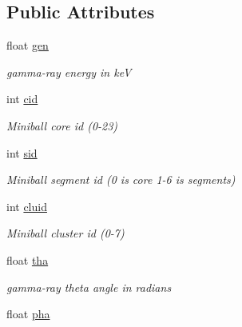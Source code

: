 \subsection*{Public Attributes}
\begin{DoxyCompactItemize}
\item 
\hypertarget{classmbevts_aaa4ca32ce18c059a2603bc496d9abf9c}{float \hyperlink{classmbevts_aaa4ca32ce18c059a2603bc496d9abf9c}{gen}}\label{classmbevts_aaa4ca32ce18c059a2603bc496d9abf9c}

\begin{DoxyCompactList}\small\item\em gamma-\/ray energy in ke\-V \end{DoxyCompactList}\item 
\hypertarget{classmbevts_a4d95d8f16b4de9d05dd5b69b43955459}{int \hyperlink{classmbevts_a4d95d8f16b4de9d05dd5b69b43955459}{cid}}\label{classmbevts_a4d95d8f16b4de9d05dd5b69b43955459}

\begin{DoxyCompactList}\small\item\em Miniball core id (0-\/23) \end{DoxyCompactList}\item 
\hypertarget{classmbevts_a16240b10e7070e1f3c1b6b9f55226609}{int \hyperlink{classmbevts_a16240b10e7070e1f3c1b6b9f55226609}{sid}}\label{classmbevts_a16240b10e7070e1f3c1b6b9f55226609}

\begin{DoxyCompactList}\small\item\em Miniball segment id (0 is core 1-\/6 is segments) \end{DoxyCompactList}\item 
\hypertarget{classmbevts_af6d424478b900af3bc8bce1f4c714105}{int \hyperlink{classmbevts_af6d424478b900af3bc8bce1f4c714105}{cluid}}\label{classmbevts_af6d424478b900af3bc8bce1f4c714105}

\begin{DoxyCompactList}\small\item\em Miniball cluster id (0-\/7) \end{DoxyCompactList}\item 
\hypertarget{classmbevts_a5c1c8f1af2a4dc025837672a2e85d492}{float \hyperlink{classmbevts_a5c1c8f1af2a4dc025837672a2e85d492}{tha}}\label{classmbevts_a5c1c8f1af2a4dc025837672a2e85d492}

\begin{DoxyCompactList}\small\item\em gamma-\/ray theta angle in radians \end{DoxyCompactList}\item 
\hypertarget{classmbevts_aaffc37faf260d3c5a495ab1c1085655d}{float \hyperlink{classmbevts_aaffc37faf260d3c5a495ab1c1085655d}{pha}}\label{classmbevts_aaffc37faf260d3c5a495ab1c1085655d}


\end{DoxyCompactItemize}

